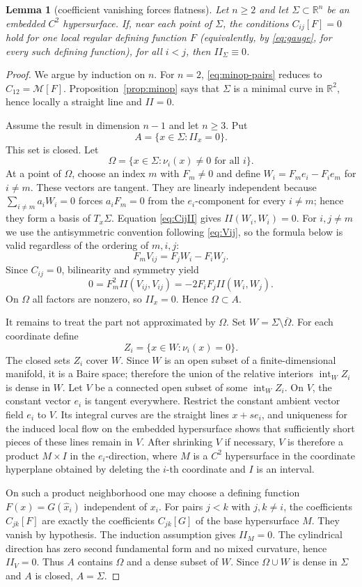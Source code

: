 \documentclass[preprint,12pt]{elsarticle}
\numberwithin{equation}{section}
\newtheorem{lemma}[theorem]{Lemma}
\theoremstyle{definition}\newtheorem{definition}[theorem]{Definition}
\theoremstyle{remark}\newtheorem{remark}[theorem]{Remark}
\begin{document}
\begin{lemma}[coefficient vanishing forces flatness]\label{lem:allcoeffflat}
Let $n\ge2$ and let $\Sigma\subset\mathbb R^n$ be an embedded $C^2$ hypersurface. If, near each point of $\Sigma$, the conditions $C_{ij}[F]=0$ hold for one local regular defining function $F$ (equivalently, by \eqref{eq:gauge}, for every such defining function), for all $i<j$, then $II_\Sigma\equiv0$.
\end{lemma}
\begin{proof}
We argue by induction on $n$. For $n=2$, \eqref{eq:minop-pairs} reduces to $C_{12}=\mathcal M[F]$. Proposition~\ref{prop:minop} says that $\Sigma$ is a minimal curve in $\mathbb R^2$, hence locally a straight line and $II=0$.

Assume the result in dimension $n-1$ and let $n\ge3$. Put
\[
A=\{x\in\Sigma:II_x=0\}.
\]
This set is closed. Let
\[
\Omega=\{x\in\Sigma:\nu_i(x)\ne0\text{ for all }i\}.
\]
At a point of $\Omega$, choose an index $m$ with $F_m\ne0$ and define $W_i=F_me_i-F_ie_m$ for $i\ne m$. These vectors are tangent. They are linearly independent because $\sum_{i\ne m}a_iW_i=0$ forces $a_iF_m=0$ from the $e_i$-component for every $i\ne m$; hence they form a basis of $T_x\Sigma$. Equation \eqref{eq:CijII} gives $II(W_i,W_i)=0$. For $i,j\ne m$ we use the antisymmetric convention following \eqref{eq:Vij}, so the formula below is valid regardless of the ordering of $m,i,j$:
\[
F_mV_{ij}=F_jW_i-F_iW_j.
\]
Since $C_{ij}=0$, bilinearity and symmetry yield
\[
0=F_m^2II(V_{ij},V_{ij})=-2F_iF_jII(W_i,W_j).
\]
On $\Omega$ all factors are nonzero, so $II_x=0$. Hence $\Omega\subset A$.

It remains to treat the part not approximated by $\Omega$. Set $W=\Sigma\setminus\overline\Omega$. For each coordinate define
\[
Z_i=\{x\in W:\nu_i(x)=0\}.
\]
The closed sets $Z_i$ cover $W$. Since $W$ is an open subset of a finite-dimensional manifold, it is a Baire space; therefore the union of the relative interiors $\operatorname{int}_W Z_i$ is dense in $W$. Let $V$ be a connected open subset of some $\operatorname{int}_W Z_i$. On $V$, the constant vector $e_i$ is tangent everywhere. Restrict the constant ambient vector field $e_i$ to $V$. Its integral curves are the straight lines $x+s e_i$, and uniqueness for the induced local flow on the embedded hypersurface shows that sufficiently short pieces of these lines remain in $V$. After shrinking $V$ if necessary, $V$ is therefore a product $M\times I$ in the $e_i$-direction, where $M$ is a $C^2$ hypersurface in the coordinate hyperplane obtained by deleting the $i$-th coordinate and $I$ is an interval.

On such a product neighborhood one may choose a defining function $F(x)=G(\widehat x_i)$ independent of $x_i$. For pairs $j<k$ with $j,k\ne i$, the coefficients $C_{jk}[F]$ are exactly the coefficients $C_{jk}[G]$ of the base hypersurface $M$. They vanish by hypothesis. The induction assumption gives $II_M=0$. The cylindrical direction has zero second fundamental form and no mixed curvature, hence $II_V=0$. Thus $A$ contains $\Omega$ and a dense subset of $W$. Since $\Omega\cup W$ is dense in $\Sigma$ and $A$ is closed, $A=\Sigma$.
\end{proof}
\end{document}
